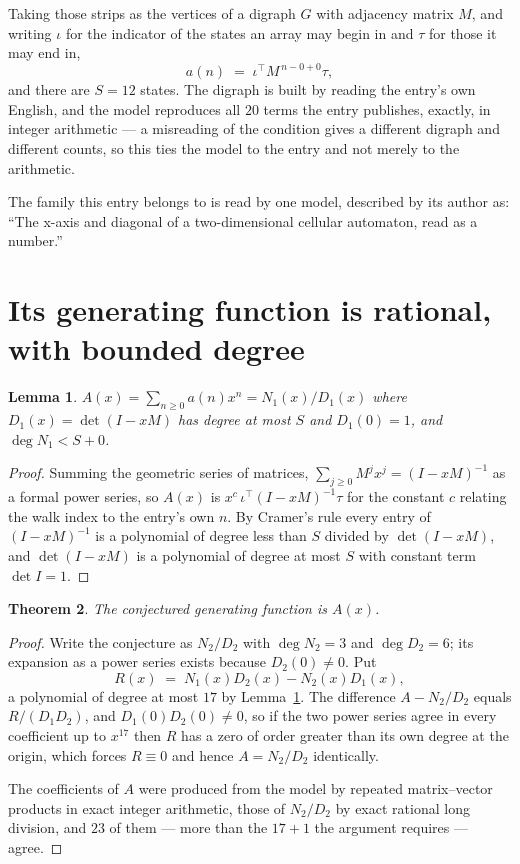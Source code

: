 \documentclass[11pt,a4paper]{article}
\theoremstyle{plain}
\newtheorem{theorem}{Theorem}
\newtheorem{lemma}[theorem]{Lemma}
\theoremstyle{definition}
\begin{document}
Taking those strips as the vertices of a digraph $G$ with adjacency matrix $M$, and writing
$\iota$ for the indicator of the states an array may begin in and $\tau$ for those it may end
in,
\[
a(n)\;=\;\iota^{\!\top}M^{\,n-0+0}\tau ,
\]
and there are $S=12$ states. The digraph is built by reading the entry's own English, and the
model reproduces all $20$ terms the entry publishes, exactly, in integer arithmetic --- a
misreading of the condition gives a different digraph and different counts, so this ties the
model to the entry and not merely to the arithmetic.

The family this entry belongs to is read by one model, described by its author as: ``The x-axis and diagonal of a two-dimensional cellular automaton, read as a number.''


\section{Its generating function is rational, with bounded degree}

\begin{lemma}\label{lem:rat}
$A(x)=\sum_{n\ge0}a(n)x^n=N_1(x)/D_1(x)$ where $D_1(x)=\det(I-xM)$ has degree at most
$S$ and $D_1(0)=1$, and $\deg N_1<S+0$.
\end{lemma}

\begin{proof}
Summing the geometric series of matrices, $\sum_{j\ge0}M^jx^j=(I-xM)^{-1}$ as a formal
power series, so $A(x)$ is $x^{c}\,\iota^{\!\top}(I-xM)^{-1}\tau$ for the constant $c$
relating the walk index to the entry's own $n$. By Cramer's rule every entry of
$(I-xM)^{-1}$ is a polynomial of degree less than $S$ divided by $\det(I-xM)$, and
$\det(I-xM)$ is a polynomial of degree at most $S$ with constant term $\det I=1$.
\end{proof}

\begin{theorem}
The conjectured generating function is $A(x)$.
\end{theorem}

\begin{proof}
Write the conjecture as $N_2/D_2$ with $\deg N_2=3$ and $\deg D_2=6$; its expansion as a
power series exists because $D_2(0)\neq0$. Put
\[
R(x)\;=\;N_1(x)D_2(x)-N_2(x)D_1(x),
\]
a polynomial of degree at most $17$ by Lemma~\ref{lem:rat}. The difference
$A-N_2/D_2$ equals $R/(D_1D_2)$, and $D_1(0)D_2(0)\neq0$, so if the two power series agree in
every coefficient up to $x^{17}$ then $R$ has a zero of order greater than its own
degree at the origin, which forces $R\equiv0$ and hence $A=N_2/D_2$ identically.

The coefficients of $A$ were produced from the model by repeated matrix--vector products in
exact integer arithmetic, those of $N_2/D_2$ by exact rational long division, and $23$
of them --- more than the $17+1$ the argument requires --- agree.
\end{proof}
\end{document}
